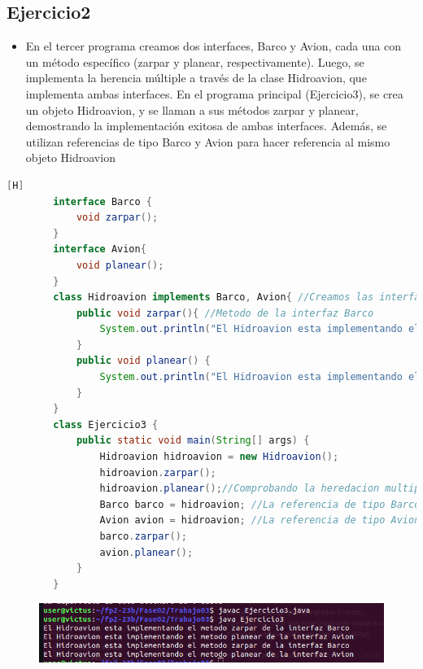 \documentclass{article}
\begin{document}
	\subsection{Ejercicio2}
	\begin{itemize}	
		\item En el tercer programa creamos dos interfaces, Barco y Avion, cada una con un método específico (zarpar y planear, respectivamente). Luego, se implementa la herencia múltiple a través de la clase Hidroavion, que implementa ambas interfaces. En el programa principal (Ejercicio3), se crea un objeto Hidroavion, y se llaman a sus métodos zarpar y planear, demostrando la implementación exitosa de ambas interfaces. Además, se utilizan referencias de tipo Barco y Avion para hacer referencia al mismo objeto Hidroavion
	\end{itemize}	
	\begin{lstlisting}[language=java,caption={Las lineas de codigos del metodo creado:}][H]
		interface Barco {
			void zarpar();
		}
		interface Avion{
			void planear();
		}
		class Hidroavion implements Barco, Avion{ //Creamos las interfaces como una herdacion multiple la cual Hidroavion tiene esta condicion donde este puede aplicar metodos de las interfaces creadas
			public void zarpar(){ //Metodo de la interfaz Barco
				System.out.println("El Hidroavion esta implementando el metodo zarpar de la interfaz Barco");
			} 
			public void planear() {
				System.out.println("El Hidroavion esta implementando el metodo planear de la interfaz Avion");
			} 
		}
		class Ejercicio3 {
			public static void main(String[] args) {
				Hidroavion hidroavion = new Hidroavion();
				hidroavion.zarpar();
				hidroavion.planear();//Comprobando la heredacion multiple por interfaces la cual creamos a un objeto hidroavion que usara metodos de las interfaces de la cual se hereda
				Barco barco = hidroavion; //La referencia de tipo Barco para hacer referencia a una instancia de Hidroavion.
				Avion avion = hidroavion; //La referencia de tipo Avion para hacer referencia a una instancia de Hidroavion.
				barco.zarpar();
				avion.planear();
			}
		}
	\end{lstlisting}
	\begin{figure}[H]
		\centering
		\includegraphics[width=1.0\textwidth,keepaspectratio]{img/Captura3.png}
	\end{figure}
\end{document}
